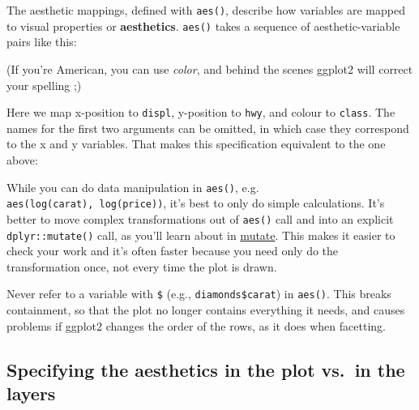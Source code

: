 
The aesthetic mappings, defined with \texttt{aes()}, describe how
variables are mapped to visual properties or \textbf{aesthetics}.
\texttt{aes()} takes a sequence of aesthetic-variable pairs like this:
 

\begin{Shaded}
\begin{Highlighting}[]
\NormalTok{(}   
\end{Highlighting}
\end{Shaded}

(If you're American, you can use \emph{color}, and behind the scenes
ggplot2 will correct your spelling ;)

Here we map x-position to \texttt{displ}, y-position to \texttt{hwy},
and colour to \texttt{class}. The names for the first two arguments can
be omitted, in which case they correspond to the x and y variables. That
makes this specification equivalent to the one above:

\begin{Shaded}
\begin{Highlighting}[]
 
\end{Highlighting}
\end{Shaded}

While you can do data manipulation in \texttt{aes()}, e.g.
\texttt{aes(log(carat),\ log(price))}, it's best to only do simple
calculations. It's better to move complex transformations out of
\texttt{aes()} call and into an explicit \texttt{dplyr::mutate()} call,
as you'll learn about in \hyperref[mutate]{mutate}. This makes it easier
to check your work and it's often faster because you need only do the
transformation once, not every time the plot is drawn.

Never refer to a variable with \texttt{\$} (e.g.,
\texttt{diamonds\$carat}) in \texttt{aes()}. This breaks containment, so
that the plot no longer contains everything it needs, and causes
problems if ggplot2 changes the order of the rows, as it does when
facetting. \indexc{\$}

\subsection{Specifying the aesthetics in the plot vs.~in the
layers}\label{sub:plots-and-layers}

